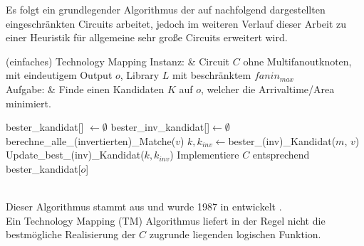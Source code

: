 \documentclass[11pt, a4paper, german]{article}
\newcommand{\TM}{Technology  Mapping }
\begin{document}
Es folgt ein grundlegender Algorithmus der auf nachfolgend dargestellten eingeschränkten Circuits arbeitet, jedoch im weiteren Verlauf dieser Arbeit zu einer Heuristik für allgemeine sehr große Circuits erweitert wird.

\begin{problem}[framed]{(einfaches) Technology Mapping}
  Instanz:  & Circuit $C$ ohne Multifanoutknoten, mit eindeutigem Output $o$, Library $L$ mit beschr\"anktem $fanin_{max}$\\
  Aufgabe: &  Finde einen Kandidaten $K$ auf $o$, welcher die Arrivaltime/Area minimiert.
\end{problem}

\begin{algorithm}[H]
 \LinesNumbered
 \DontPrintSemicolon
 \caption{(einfaches) Technology Mapping}

 bester\_kandidat[] $\gets \emptyset$\;
 bester\_inv\_kandidat[]$ \gets \emptyset$\;
 {
   berechne\_alle\_(invertierten)\_Matche($v$)\;
   {
      $k,k_{inv} \gets $bester\_(inv)\_Kandidat($m$, $v$)\;
      Update\_best\_(inv)\_Kandidat($k,k_{inv}$)\;
   }
 }
 Implementiere $C$ entsprechend bester\_kandidat[$o$]\;
\end{algorithm}\ \\
Dieser Algorithmus stammt aus \cite{Elbert} und wurde 1987 in \cite{DAGON} entwickelt .\\
Ein \TM (TM) Algorithmus liefert in der Regel nicht die bestmögliche Realisierung der $C$ zugrunde liegenden logischen Funktion.\\
\end{document}
